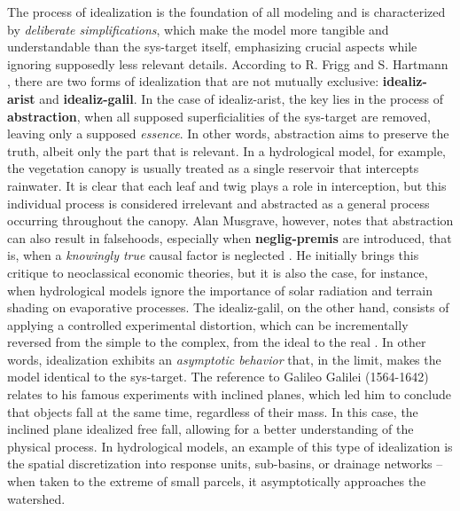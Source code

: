 \documentclass[./main_en.tex]{subfiles}
\begin{document}
\par The process of \gls{idealization} is the foundation of all modeling and is characterized by \textit{deliberate simplifications}, which make the \gls{model} more tangible and understandable than the \gls{sys-target} itself, emphasizing crucial aspects while ignoring supposedly less relevant details. According to R. Frigg and S. Hartmann \cite{sep-models-science}, there are two forms of \gls{idealization} that are not mutually exclusive: \textbf{\gls{idealiz-arist}} and \textbf{\gls{idealiz-galil}}. In the case of \gls{idealiz-arist}, the key lies in the process of \textbf{\gls{abstraction}}, when all supposed superficialities of the \gls{sys-target} are removed, leaving only a supposed \textit{essence}. In other words, \gls{abstraction} aims to preserve the truth, albeit only the part that is relevant. In a hydrological \gls{model}, for example, the vegetation canopy is usually treated as a single reservoir that intercepts rainwater. It is clear that each leaf and twig plays a role in \gls{interception}, but this individual process is considered irrelevant and abstracted as a general process occurring throughout the canopy. Alan Musgrave, however, notes that \gls{abstraction} can also result in falsehoods, especially when \textbf{\gls{neglig-premis}} are introduced, that is, when a \textit{knowingly true} causal factor is neglected \cite{musgrave1981}. He initially brings this critique to neoclassical economic theories, but it is also the case, for instance, when hydrological models ignore the importance of solar radiation and terrain shading on evaporative processes. The \gls{idealiz-galil}, on the other hand, consists of applying a controlled experimental distortion, which can be incrementally reversed from the simple to the complex, from the ideal to the real \cite{MCMULLIN1985}. In other words, \gls{idealization} exhibits an \textit{asymptotic behavior} that, in the limit, makes the \gls{model} identical to the \gls{sys-target}. The reference to Galileo Galilei (1564-1642) relates to his famous experiments with inclined planes, which led him to conclude that objects fall at the same time, regardless of their mass. In this case, the inclined plane idealized free fall, allowing for a better understanding of the physical process. In hydrological models, an example of this type of \gls{idealization} is the spatial discretization into response units, sub-basins, or drainage networks – when taken to the extreme of small parcels, it asymptotically approaches the watershed.
\end{document}
